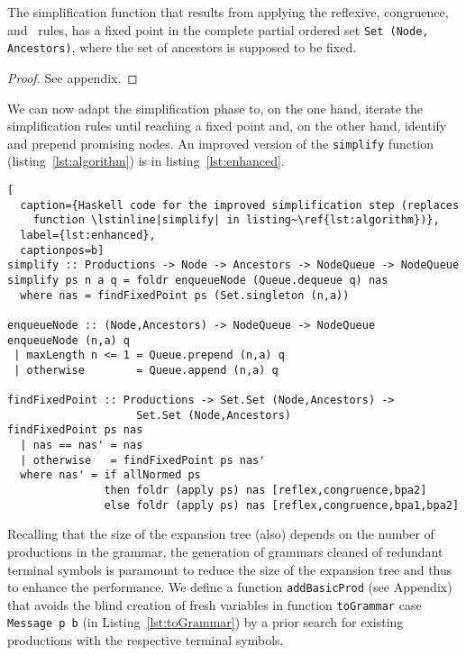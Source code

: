 
\begin{theorem}
  \label{thm:fixed_point}
  The simplification function that results from applying the
  reflexive, congruence, and \BPA\ rules, has a fixed point in the
  complete partial ordered set
  {\upshape\lstinline|Set (Node, Ancestors)|}, where the set of
  ancestors is supposed to be fixed. %
\end{theorem}
%
\begin{proof}
  See appendix.
\end{proof}

We can now adapt the
simplification phase to, on the one hand, iterate the simplification
rules until reaching a fixed point and, on the other hand, identify
and prepend promising nodes. An improved version of the
\lstinline|simplify| function (listing~\ref{lst:algorithm}) is in
listing~\ref{lst:enhanced}.

\begin{lstlisting}[
  caption={Haskell code for the improved simplification step (replaces
    function \lstinline|simplify| in listing~\ref{lst:algorithm})},
  label={lst:enhanced},
  captionpos=b]
simplify :: Productions -> Node -> Ancestors -> NodeQueue -> NodeQueue
simplify ps n a q = foldr enqueueNode (Queue.dequeue q) nas
  where nas = findFixedPoint ps (Set.singleton (n,a))

enqueueNode :: (Node,Ancestors) -> NodeQueue -> NodeQueue
enqueueNode (n,a) q
 | maxLength n <= 1 = Queue.prepend (n,a) q
 | otherwise        = Queue.append (n,a) q

findFixedPoint :: Productions -> Set.Set (Node,Ancestors) -> 
                    Set.Set (Node,Ancestors)
findFixedPoint ps nas
  | nas == nas' = nas
  | otherwise   = findFixedPoint ps nas'
  where nas' = if allNormed ps
               then foldr (apply ps) nas [reflex,congruence,bpa2]
               else foldr (apply ps) nas [reflex,congruence,bpa1,bpa2]
\end{lstlisting}

Recalling that the size of the expansion tree (also) depends on the 
number of productions in the grammar, the generation of grammars cleaned
of redundant terminal symbols is paramount to reduce the size of the
expansion tree and thus to enhance the performance. We define a 
function \lstinline|addBasicProd| (see Appendix) that avoids the 
blind creation of 
fresh variables in function \lstinline|toGrammar| case 
\lstinline|Message p b| 
(in Listing~\ref{lst:toGrammar}) by a prior search for existing productions
with the respective terminal symbols.

